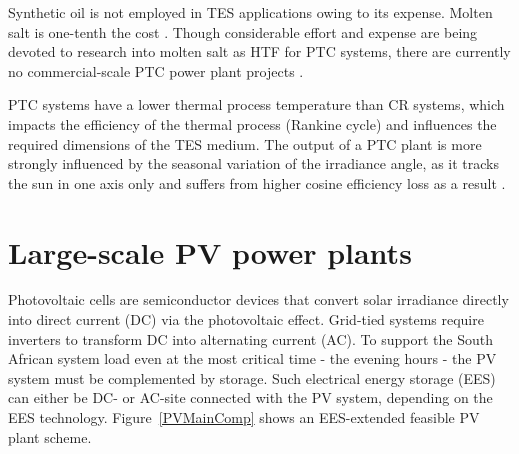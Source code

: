 Synthetic oil is not employed in \ac{TES} applications owing to its expense. Molten salt is one-tenth the cost \cite{Gil2010}. Though considerable effort and expense are being devoted to research into molten salt as \ac{HTF} for \ac{PTC} systems, there are currently no commercial-scale \ac{PTC} power plant projects \cite{Maccari2015}.

%

\ac{PTC} systems have a lower thermal process temperature than \ac{CR} systems, which impacts the efficiency of the thermal process (Rankine cycle) and influences the required dimensions of the \ac{TES} medium. The output of a \ac{PTC} plant is more strongly influenced by the seasonal variation of the irradiance angle, as it tracks the sun in one axis only and suffers from higher cosine efficiency loss as a result \cite{Jorgenson2013}.

\section{Large-scale PV power plants}\label{Large scale photo voltaic (PV) power plants}

Photovoltaic cells are semiconductor devices that convert solar irradiance directly into direct current (DC) via the photovoltaic effect.
Grid-tied systems require inverters to transform DC into alternating current (AC). To support the South African system load even at the most critical time - the evening hours - the PV system must be complemented by storage. Such electrical energy storage (EES) can either be DC- or AC-site connected with the PV system, depending on the EES technology. Figure~\ref{PVMainComp} shows an EES-extended feasible PV plant scheme.


